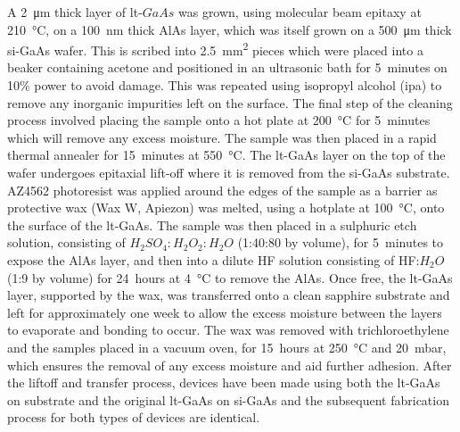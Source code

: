 A \SI{2}{\micro\metre} thick layer of \acrshort{lt}\nobreakdash-\(GaAs\) was grown, using molecular beam epitaxy at \SI{210}{\celsius}, on a \SI{100}{nm} thick AlAs layer, which was itself grown on a \SI{500}{\micro\metre} thick \acrshort{si}\nobreakdash-GaAs wafer. This is scribed into \SI{2.5}{mm^2} pieces which were placed into a beaker containing acetone and positioned in an ultrasonic bath for \SI{5}{minutes} on 10\% power to avoid damage. This was repeated using isopropyl alcohol (\acrshort{ipa}) to remove any inorganic impurities left on the surface. The final step of the cleaning process involved placing the sample onto a hot plate at \SI{200}{\celsius} for \SI{5}{minutes} which will remove any excess moisture. The sample was then placed in a rapid thermal annealer for \SI{15}{minutes} at \SI{550}{\celsius}. 
The \acrshort{lt}\nobreakdash-GaAs layer on the top of the wafer undergoes epitaxial lift-off where it is removed from the \acrshort{si}\nobreakdash-GaAs substrate. AZ4562 photoresist was applied around the edges of the sample as a barrier as protective wax (Wax W, Apiezon) was melted, using a hotplate at \SI{100}{\celsius}, onto the surface of the \acrshort{lt}\nobreakdash-GaAs. The sample was then placed in a sulphuric etch solution, consisting of \(H_2SO_4:H_2O_2:H_2O\) (1:40:80 by volume), for \SI{5}{minutes} to expose the AlAs layer, and then into a dilute HF solution consisting of HF:\(H_2O\) (1:9 by volume) for \SI{24}{hours} at \SI{4}{\celsius} to remove the AlAs. Once free, the \acrshort{lt}\nobreakdash-GaAs layer, supported by the wax, was transferred onto a clean sapphire substrate and left for approximately one week to allow the excess moisture between the layers to evaporate and bonding to occur. The wax was removed with trichloroethylene and the samples placed in a vacuum oven, for \SI{15}{hours} at \SI{250}{\celsius} and \SI{20}{mbar}, which ensures the removal of any excess moisture and aid further adhesion. After the liftoff and transfer process, devices have been made using both the \acrshort{lt}\nobreakdash-GaAs on substrate and the original \acrshort{lt}\nobreakdash-GaAs on \acrshort{si}\nobreakdash-GaAs and the subsequent fabrication process for both types of devices are identical. 

